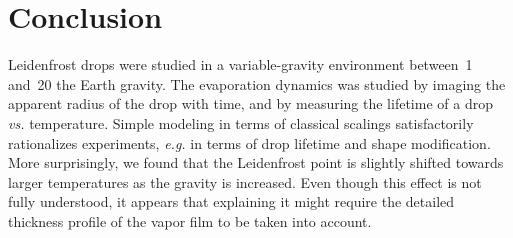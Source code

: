 \documentclass[doublecol,final]{epl2}
\begin{document}
\section{Conclusion}

Leidenfrost drops were studied in a variable-gravity environment between~1 and~20 the Earth gravity. The evaporation dynamics was studied by imaging the apparent radius of the drop with time, and by measuring the lifetime of a drop \textit{vs.} temperature. Simple modeling in terms of classical scalings\cite{epl17032bib3} satisfactorily rationalizes experiments, \textit{e.g.} in terms of drop lifetime and shape modification. More surprisingly, we found that the Leidenfrost point is slightly shifted towards larger temperatures as the gravity is increased. Even though this effect is not fully understood, it appears that explaining it might require the detailed thickness profile of the vapor film to be taken into account.

\end{document}
